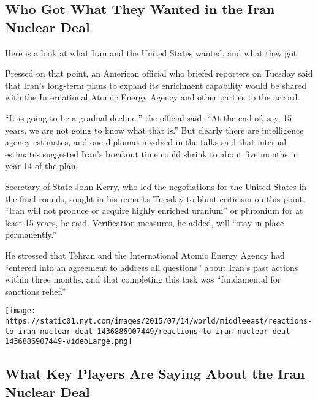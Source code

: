 \hypertarget{who-got-what-they-wanted-in-the-iran-nuclear-deal}{%
\subsection{Who Got What They Wanted in the Iran Nuclear
Deal}\label{who-got-what-they-wanted-in-the-iran-nuclear-deal}}

Here is a look at what Iran and the United States wanted, and what they
got.

Pressed on that point, an American official who briefed reporters on
Tuesday said that Iran's long-term plans to expand its enrichment
capability would be shared with the International Atomic Energy Agency
and other parties to the accord.

``It is going to be a gradual decline,'' the official said. ``At the end
of, say, 15 years, we are not going to know what that is.'' But clearly
there are intelligence agency estimates, and one diplomat involved in
the talks said that internal estimates suggested Iran's breakout time
could shrink to about five months in year 14 of the plan.

Secretary of State
\href{http://topics.nytimes.com/top/reference/timestopics/people/k/john_kerry/index.html?inline=nyt-per}{John
Kerry}, who led the negotiations for the United States in the final
rounds, sought in his remarks Tuesday to blunt criticism on this point.
``Iran will not produce or acquire highly enriched uranium'' or
plutonium for at least 15 years, he said. Verification measures, he
added, will ``stay in place permanently.''

He stressed that Tehran and the International Atomic Energy Agency had
``entered into an agreement to address all questions'' about Iran's past
actions within three months, and that completing this task was
``fundamental for sanctions relief.''

\href{https://www.nytimes.com/interactive/2015/07/14/world/middleeast/reactions-to-iran-nuclear-deal.html}{}

\texttt{[image: https://static01.nyt.com/images/2015/07/14/world/middleeast/reactions-to-iran-nuclear-deal-1436886907449/reactions-to-iran-nuclear-deal-1436886907449-videoLarge.png]}

\hypertarget{what-key-players-are-saying-about-the-iran-nuclear-deal}{%
\subsection{What Key Players Are Saying About the Iran Nuclear
Deal}\label{what-key-players-are-saying-about-the-iran-nuclear-deal}}

